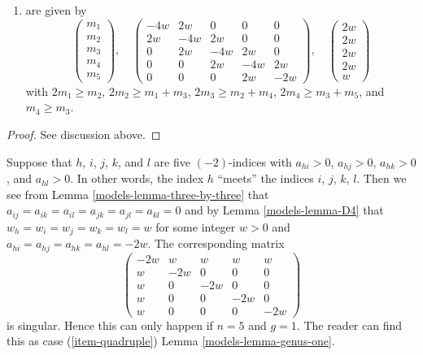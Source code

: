 \begin{lemma}
\begin{enumerate}
$$\begin{matrix}
0 & 0 & w & -2w & 2w \\
0 & 0 & 0 & 2w & -4w
\end{matrix}
\right),
\quad
\left(
\begin{matrix}
w \\
w \\
w \\
w \\
2w
\end{matrix}
\right)
$$
with $2m_1 \geq m_2$, $2m_2 \geq m_1 + m_3$, $2m_3 \geq m_2 + 2m_4$,
$2m_4 \geq m_3 + m_5$, and $2m_5 \geq m_4$, or
\item
\label{models-item-B5}
are given by
$$
\left(
\begin{matrix}
m_1 \\
m_2 \\
m_3 \\
m_4 \\
m_5
\end{matrix}
\right),
\quad
\left(
\begin{matrix}
-4w & 2w & 0 & 0 & 0 \\
2w & -4w & 2w & 0 & 0 \\
0 & 2w & -4w & 2w & 0 \\
0 & 0 & 2w & -4w & 2w \\
0 & 0 & 0 & 2w & -2w
\end{matrix}
\right),
\quad
\left(
\begin{matrix}
2w \\
2w \\
2w \\
2w \\
w
\end{matrix}
\right)
$$
with $2m_1 \geq m_2$, $2m_2 \geq m_1 + m_3$, $2m_3 \geq m_2 + m_4$,
$2m_4 \geq m_3 + m_5$, and $m_4 \geq m_3$.
\end{enumerate}
\end{lemma}

\begin{proof}
See discussion above.
\end{proof}

Suppose that $h$, $i$, $j$, $k$, and $l$ are five $(-2)$-indices
with $a_{hi} > 0$, $a_{hj} > 0$, $a_{hk} > 0$, and $a_{hl} > 0$.
In other words, the index $h$ ``meets'' the indices
$i$, $j$, $k$, $l$. Then we see from Lemma \ref{models-lemma-three-by-three}
that $a_{ij} = a_{ik} = a_{il} = a_{jk} = a_{jl} = a_{kl} = 0$ and
by Lemma \ref{models-lemma-D4} that
$w_h = w_i = w_j = w_k = w_l = w$ for some integer $w > 0$ and
$a_{hi} = a_{hj} = a_{hk} = a_{hl} = -2w$.
The corresponding matrix
$$
\left(
\begin{matrix}
-2w & w & w & w & w \\
w & -2w & 0 & 0 & 0 \\
w & 0 & -2w & 0 & 0 \\
w & 0 & 0 & -2w & 0 \\
w & 0 & 0 & 0 & -2w
\end{matrix}
\right)
$$
is singular. Hence this can only happen if $n = 5$ and $g = 1$.
The reader can find this as case
(\ref{item-quadruple}) Lemma \ref{models-lemma-genus-one}.

